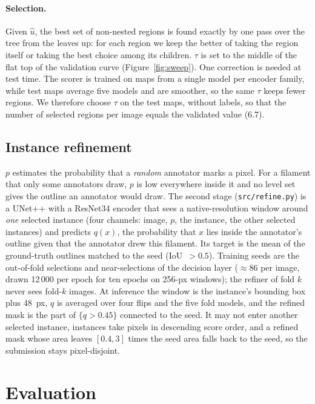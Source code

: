 \documentclass[sigconf]{acmart}
\begin{document}
\paragraph{Selection.} Given $\hat u$, the best set of non-nested regions is found exactly by one pass over the tree from the leaves up: for each region we keep the better of taking the region itself or taking the best choice among its children. $\tau$ is set to the middle of the flat top of the validation curve (Figure~\ref{fig:sweep}). One correction is needed at test time. The scorer is trained on maps from a single model per encoder family, while test maps average five models and are smoother, so the same $\tau$ keeps fewer regions. We therefore choose $\tau$ on the test maps, without labels, so that the number of selected regions per image equals the validated value (6.7).

\subsection{Instance refinement}\label{sec:refine}
$p$ estimates the probability that a \emph{random} annotator marks a pixel. For a filament that only some annotators draw, $p$ is low everywhere inside it and no level set gives the outline an annotator would draw. The second stage (\texttt{src/refine.py}) is a UNet++ \cite{zhou2018unetpp} with a ResNet34 encoder \cite{he2016resnet} that sees a native-resolution window around \emph{one} selected instance (four channels: image, $p$, the instance, the other selected instances) and predicts $q(x)$, the probability that $x$ lies inside the annotator's outline given that the annotator drew this filament. Its target is the mean of the ground-truth outlines matched to the seed (IoU~$>0.5$). Training seeds are the out-of-fold selections and near-selections of the decision layer ($\approx$86 per image, drawn 12\,000 per epoch for ten epochs on 256-px windows); the refiner of fold $k$ never sees fold-$k$ images. At inference the window is the instance's bounding box plus 48~px, $q$ is averaged over four flips and the five fold models, and the refined mask is the part of $\{q>0.45\}$ connected to the seed. It may not enter another selected instance, instances take pixels in descending score order, and a refined mask whose area leaves $[0.4,3]$ times the seed area falls back to the seed, so the submission stays pixel-disjoint.

\section{Evaluation}\label{sec:evaluation}
\end{document}
